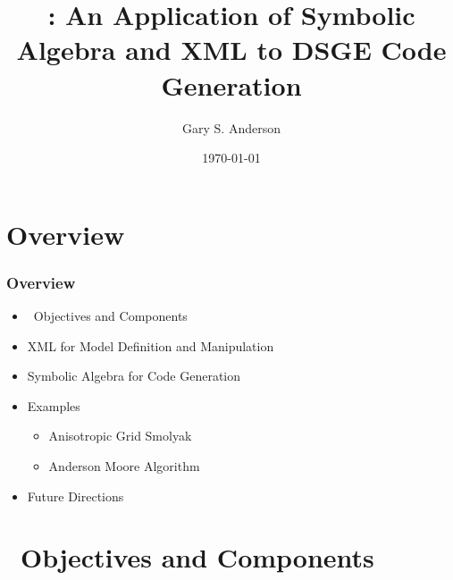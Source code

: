 \documentclass{beamer}
\begin{document}
\title[Symbolic Algebra/XML and Code Generation]{\dsgecg: An Application of Symbolic Algebra and XML to DSGE Code Generation}


\author{Gary S. Anderson}
\date{\today} 


\frame{\titlepage}


\section{Overview}



\begin{frame}
  \frametitle{Overview}
  
  \begin{itemize}
  \item \dsgecg\  Objectives and Components
  \item XML for Model Definition and Manipulation
  \item Symbolic Algebra for Code Generation
  \item Examples
    \begin{itemize}
    \item Anisotropic Grid Smolyak
    \item Anderson Moore Algorithm 
    \end{itemize}
  \item Future Directions
  \end{itemize}
\end{frame}

\section{\dsgecg\  Objectives and Components}
\end{document}
